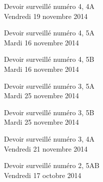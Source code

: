 \documentclass[a4paper,10pt]{article}
\begin{document}
\begin{feuilleDS}{Devoir surveillé numéro 4, 4A\\ \small Vendredi 19 novembre 2014}
\end{feuilleDS}


\begin{feuilleDS}{Devoir surveillé numéro 4, 5A\\ \small Mardi 16 novembre 2014}
\end{feuilleDS}

\begin{feuilleDS}{Devoir surveillé numéro 4, 5B\\ \small Mardi 16 novembre 2014}
\end{feuilleDS}


\begin{feuilleDS}{Devoir surveillé numéro 3, 5A\\ \small Mardi 25 novembre 2014}
\end{feuilleDS}

\begin{feuilleDS}{Devoir surveillé numéro 3, 5B\\ \small Mardi 25 novembre 2014}
\end{feuilleDS}

\begin{feuilleDS}{Devoir surveillé numéro 3, 4A\\ \small Vendredi 21 novembre 2014}
\end{feuilleDS}

\begin{feuilleDS}{Devoir surveillé numéro 2, 5AB\\ \small Vendredi 17 octobre 2014}  %
\end{feuilleDS}
\end{document}
